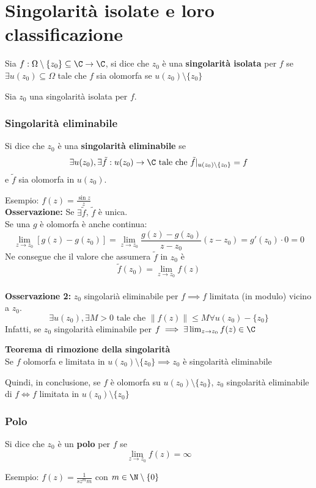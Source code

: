 

\section{Singolarità isolate e loro classificazione}	
\begin{tcolorbox}
	Sia $f:\Omega \setminus \{z_0\} \subseteq\C\to \C$, si dice che $z_0$ è una \textbf{singolarità isolata} per $f$ se $\exists u(z_0)\subseteq\Omega$ tale che $f$ sia olomorfa se $u(z_0)\setminus \{z_0\}$  
\end{tcolorbox}
Sia $z_0$ una singolarità isolata per $f$.
\subsubsection{Singolarità eliminabile}
\begin{tcolorbox}
Si dice che $z_0$ è una \textbf{singolarità eliminabile} se 
\[\exists u(z_0),\exists\tilde f:u(z_0)\to \C \text{ tale che }\tilde f|_{u(z_0)\setminus \{z_0\} }=f\]
e $\tilde f$ sia olomorfa in $u(z_0)$.
\end{tcolorbox}
Esempio: $f(z)= \frac{\sin z}{z}$
\\\textbf{Osservazione:} Se $\exists \tilde f$, $\tilde f$ è unica.
\\Se una $g$ è olomorfa è anche continua:
\[\lim_{z \to z_0} [g(z)-g(z_0)]=\lim_{z \to z_0} \frac{g(z)-g(z_0)}{z-z_0}(z-z_0)=g'(z_0)\cdot 0=0\]
Ne consegue che il valore che assumera $\tilde f$ in $z_0$ è 
\[\tilde f(z_0)=\lim_{z \to z_0} f(z)\]\\
\textbf{Osservazione 2:} $z_0$ singolarià eliminabile per $f\implies f$ limitata (in modulo) vicino a $z_0$.
\[\exists u(z_0), \exists M>0 \text{ tale che } \|f(z)\|\le M\forall u(z_0)-\{z_0\} \]
Infatti, se $z_0$ singolarità eliminabile per $f\implies \exists \lim_{z \to z_0} f(z)\in\C$
\begin{tcolorbox}
	\textbf{Teorema di rimozione della singolarità} 
	\\Se $f$ olomorfa e limitata in $u(z_0)\setminus \{z_0\} \implies z_0$ è singolarità eliminabile
\end{tcolorbox}
Quindi, in conclusione, se $f$ è olomorfa su $u(z_0)\setminus \{z_0\} $, $z_0$ singolarità eliminabile di $f \iff f$ limitata in $u(z_0)\setminus \{z_0\} $ 
\subsubsection{Polo}
\begin{tcolorbox}
	Si dice che $z_0$ è un \textbf{polo} per $f$ se 
	\[\lim_{z \to z_0} f(z)=\infty\]
\end{tcolorbox}
Esempio: $f(z)=\frac{1}{sz^mm}$ con $m\in \N\setminus \{0\} $

